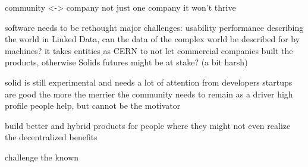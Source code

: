 community <-> company
not just one company it won't thrive

software needs to be rethought
major challenges:
    usability
    performance
    describing the world in Linked Data, can the data of the complex world be described for by machines?
it takes entities as CERN to not let commercial companies built the products, otherwise Solids futures might be at stake? (a bit harsh)

solid is still experimental and needs a lot of attention from developers
startups are good
the more the merrier
the community needs to remain as a driver
high profile people help, but cannot be the motivator

build better and hybrid products for people where they might not even realize the decentralized benefits

challenge the known